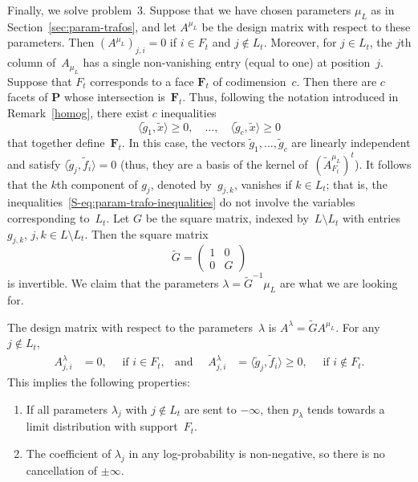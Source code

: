 \documentclass[aos,noinfoline]{imsart}
\def\<{\langle}
\def\>{\rangle}
\newcommand{\Fbf}{\mathbf{F}}
\newcommand{\Pbf}{\mathbf{P}}
\theoremstyle{remark}
\theoremstyle{definition}
\begin{document}
Finally, we solve problem~3.  Suppose that we have chosen parameters $\mu_{L}$ as in Section~\ref{sec:param-trafos}, and
let $A^{\mu_{L}}$ be the design matrix with respect to these parameters.  Then $(A^{\mu_{L}})_{j,i}=0$ if $i\in F_{t}$
and $j\notin L_{t}$.  Moreover, for $j\in L_{t}$, the $j$th column %
of~$A_{\mu_{L}}$ has a single non-vanishing entry (equal to one) at position~$j$.  Suppose that $F_{t}$ corresponds to a
face $\Fbf_{t}$ of codimension~$c$.  Then there are $c$ facets of $\Pbf$ whose intersection is~$\Fbf_{t}$.  Thus,
following the notation introduced in Remark~\ref{homog}, there exist $c$ inequalities
\begin{equation}
  \label{S-eq:param-trafo-inequalities}
  \<\tilde g_{1}, \tilde x\> \ge 0,\quad\dots,\quad \<\tilde g_{c}, \tilde x\> \ge 0
\end{equation}
that together define~$\Fbf_{t}$.  In this case, the vectors $\tilde g_{1},\dots,\tilde g_{c}$ are linearly independent
and satisfy $\<\tilde g_{j},\tilde f_{i}\>=0$ (thus, they are a basis of the kernel of~$(\tilde
A^{\mu_{L}}_{F_{t}})^{t}$).  It follows that the $k$th component of $g_{j}$, denoted by~$g_{j,k}$, vanishes if $k\in
L_{t}$; that is, the inequalities~\eqref{S-eq:param-trafo-inequalities} do not involve the variables corresponding
to~$L_{t}$.  Let $G$ be the square matrix, indexed by~$L\setminus L_{t}$ with entries $g_{j,k}$, $j,k\in L\setminus
L_{t}$.  Then the square matrix
\begin{equation*}
  \tilde G =
  \begin{pmatrix}
    1 & 0 \\
    0 & G
  \end{pmatrix}
\end{equation*}
is invertible.  We claim that the parameters $\lambda = \tilde G^{-1}\mu_{L}$ are what we are looking for.

The design matrix with respect to the parameters~$\lambda$ is $A^{\lambda}=\tilde G A^{\mu_{L}}$.  For any $j\notin
L_{t}$,
\begin{align*}
  A^{\lambda}_{j,i} & = 0, \quad \text{ if }i\in F_{t}, & \text{and }\quad %
  A^{\lambda}_{j,i} & = \<\tilde g_{j},\tilde f_{i}\> \ge 0, \quad \text{ if }i\notin F_{t}.
\end{align*}
This implies the following properties:
\begin{enumerate}
\item If all parameters $\lambda_{j}$ with $j\notin L_{t}$ are sent to $-\infty$, then $p_{\lambda}$ tends towards a
  limit distribution with support~$F_{t}$.
\item The coefficient of $\lambda_{j}$ in any log-probability is non-negative, so there is no cancellation of
  $\pm\infty$.
\end{enumerate}
\end{document}
